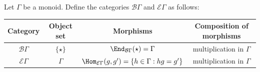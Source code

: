 \begin{example}\label{eg:classifying-space}
	Let $\Gamma$ be a monoid. Define the categories $\mathcal{B}\Gamma$ and
	$\mathcal{E}\Gamma$ as follows:
	\begin{center}\begin{tabular}{|c|c|c|c|}\hline
		Category & Object set & Morphisms & Composition of morphisms \\ \hline
		$\mathcal{B}\Gamma$ & $\{\star\}$ & $\End_{\mathcal{B}\Gamma}(\star)=\Gamma$ & multiplication in $\Gamma$ \\ \hline
		$\mathcal{E}\Gamma$ & $\Gamma$ & $\Hom_{\mathcal{E}\Gamma}(g,g')=\{h\in\Gamma:hg=g'\}$ & multiplication in $\Gamma$ \\ \hline
	\end{tabular}\end{center}


\end{example}
